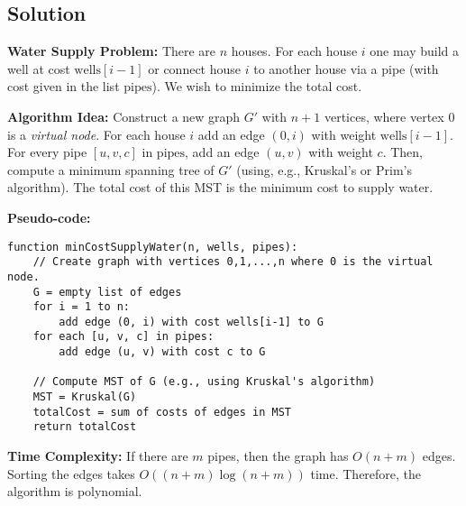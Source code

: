 \documentclass[12pt]{article}
\begin{document}
\subsection*{Solution}
\textbf{Water Supply Problem:}  
There are \(n\) houses. For each house \(i\) one may build a well at cost \(\text{wells}[i-1]\) or connect house \(i\) to another house via a pipe (with cost given in the list \(\text{pipes}\)). We wish to minimize the total cost.

\textbf{Algorithm Idea:}  
Construct a new graph \(G'\) with \(n+1\) vertices, where vertex 0 is a \emph{virtual node}. For each house \(i\) add an edge \((0,i)\) with weight \(\text{wells}[i-1]\). For every pipe \([u,v,c]\) in \(\text{pipes}\), add an edge \((u,v)\) with weight \(c\). Then, compute a minimum spanning tree of \(G'\) (using, e.g., Kruskal's or Prim's algorithm). The total cost of this MST is the minimum cost to supply water.

\textbf{Pseudo-code:}
\begin{verbatim}
function minCostSupplyWater(n, wells, pipes):
    // Create graph with vertices 0,1,...,n where 0 is the virtual node.
    G = empty list of edges
    for i = 1 to n:
        add edge (0, i) with cost wells[i-1] to G
    for each [u, v, c] in pipes:
        add edge (u, v) with cost c to G

    // Compute MST of G (e.g., using Kruskal's algorithm)
    MST = Kruskal(G)
    totalCost = sum of costs of edges in MST
    return totalCost
\end{verbatim}
\textbf{Time Complexity:}  
If there are \(m\) pipes, then the graph has \(O(n+m)\) edges. Sorting the edges takes \(O((n+m)\log (n+m))\) time. Therefore, the algorithm is polynomial.

\vspace{0.5cm}

\hrulefill
\end{document}
